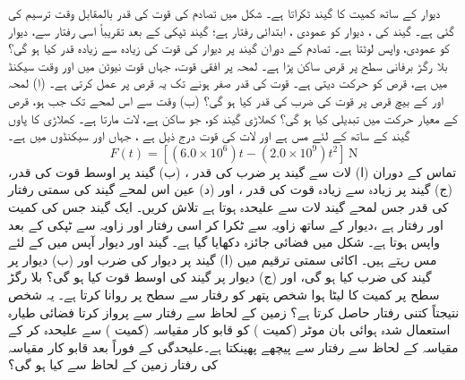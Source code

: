 دیوار کے ساتھ  کمیت کا  گیند  ٹکراتا ہے۔ شکل  میں تصادم کی قوت کی قدر  بالمقابل وقت  ترسیم کی گئی ہے۔ گیند کی  ، دیوار کو عمودی ، ابتدائی رفتار    ہے؛ گیند  ٹپکی کے بعد تقریباً اسی رفتار سے، دیوار کو عمودی،  واپس  لوٹتا ہے۔ تصادم کے دوران  گیند پر  دیوار کی  قوت کی زیادہ سے زیادہ قدر  کیا ہو گی؟
بلا رگڑ برفانی  سطح پر  قرص ساکن پڑا ہے۔ لمحہ  پر     افقی قوت، جہاں قوت  نیوٹن میں اور وقت   سیکنڈ میں  ہے، قرص کو  حرکت دیتی ہے۔ قوت  کی قدر صفر ہونے تک  یہ قرص پر عمل کرتی ہے۔ (ا) لمحہ   اور  کے بیچ قرص پر   قوت کی ضرب کی قدر کیا ہو گی؟ (ب) وقت  سے اس  لمحے تک جب  ہو، قرص کے معیار حرکت میں تبدیلی کیا ہو گی؟
کھلاڑی  گیند کو، جو ساکن ہے،  لات مارتا ہے۔ کھلاڑی کا پاوں گیند کے ساتھ  کے لئے مس ہے اور لات کی  قوت  درج ذیل ہے ، جہاں  اور   سیکنڈوں میں ہے۔
\[F(t)=[(6.0\times 10^6)t-(2.0\times 10^9)t^2]\,\si{\newton}\]
تماس کے دوران (ا) لات  سے گیند پر ضرب کی قدر   ،  (ب) گیند پر   اوسط قوت کی قدر،    (ج) گیند پر  زیادہ سے زیادہ قوت  کی قدر    ، اور  (د) عین  اس لمحے گیند کی سمتی رفتار  کی قدر جس لمحے گیند لات سے علیحدہ ہوتا ہے  تلاش کریں۔
ایک گیند جس کی کمیت  اور رفتار  ہے ،دیوار کے ساتھ  زاویہ  سے   ٹکرا کر  اسی رفتار اور زاویہ سے ٹپکی کے بعد   واپس ہوتا  ہے۔ شکل  میں  فضائی جائزہ دکھایا گیا ہے۔ گیند اور دیوار آپس میں  کے لئے  مس   رہتے  ہیں۔ اکائی  سمتی ترقیم میں   (ا) گیند پر دیوار کی  ضرب اور (ب) دیوار پر گیند کی ضرب  کیا ہو گی، اور (ج)  دیوار پر گیند کی اوسط قوت کیا ہو گی؟
بلا رگڑ سطح پر   کمیت کا لیٹا ہوا  شخص    پتھر کو  رفتار سے  سطح پر روانا کرتا ہے۔ یہ شخص نتیجتاً کتنی رفتار حاصل کرتا ہے؟
زمین کے لحاظ سے  رفتار سے پرواز کرتا فضائی طیارہ استعمال شدہ  ہوائی بان موٹر (کمیت )    کو قابو کار  مقیاسہ  (کمیت  )  سے علیحدہ کر کے   مقیاسہ کے لحاظ سے  رفتار سے پیچھے  پھینکتا ہے۔علیحدگی کے فوراً بعد قابو کار مقیاسہ کی رفتار زمین کے لحاظ سے کیا ہو گی؟
